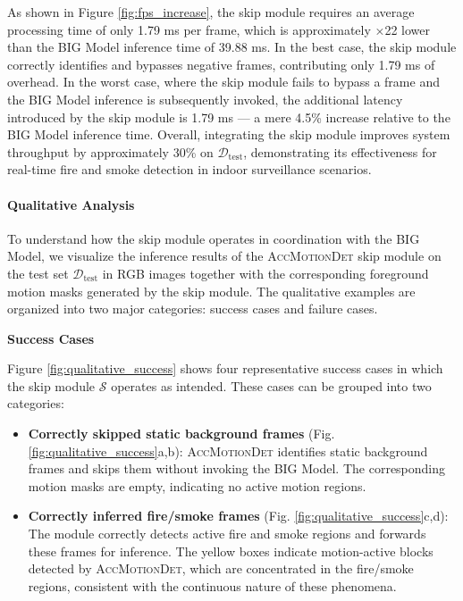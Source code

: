 \documentclass[
  10pt,
]{article}
\begin{document}
As shown in Figure \ref{fig:fps_increase}, the skip module requires an
average processing time of only 1.79 ms per frame, which is
approximately ×22 lower than the BIG Model inference time of 39.88 ms.
In the best case, the skip module correctly identifies and bypasses
negative frames, contributing only 1.79 ms of overhead. In the worst
case, where the skip module fails to bypass a frame and the BIG Model
inference is subsequently invoked, the additional latency introduced by
the skip module is 1.79 ms --- a mere 4.5\% increase relative to the BIG
Model inference time. Overall, integrating the skip module improves
system throughput by approximately 30\% on \(\mathcal{D}_\text{test}\),
demonstrating its effectiveness for real-time fire and smoke detection
in indoor surveillance scenarios.

\paragraph{Qualitative Analysis}\label{qualitative-analysis}

To understand how the skip module operates in coordination with the BIG
Model, we visualize the inference results of the \textsc{AccMotionDet}
skip module on the test set \(\mathcal{D}_\text{test}\) in RGB images
together with the corresponding foreground motion masks generated by the
skip module. The qualitative examples are organized into two major
categories: success cases and failure cases.

\textbf{Success Cases}



Figure \ref{fig:qualitative_success} shows four representative success
cases in which the skip module \(\mathcal{S}\) operates as intended.
These cases can be grouped into two categories:

\begin{itemize}
\item
  \textbf{Correctly skipped static background frames} (Fig.
  \ref{fig:qualitative_success}a,b): \textsc{AccMotionDet} identifies
  static background frames and skips them without invoking the BIG
  Model. The corresponding motion masks are empty, indicating no active
  motion regions.
\item
  \textbf{Correctly inferred fire/smoke frames} (Fig.
  \ref{fig:qualitative_success}c,d): The module correctly detects active
  fire and smoke regions and forwards these frames for inference. The
  yellow boxes indicate motion-active blocks detected by
  \textsc{AccMotionDet}, which are concentrated in the fire/smoke
  regions, consistent with the continuous nature of these phenomena.
\end{itemize}
\end{document}
